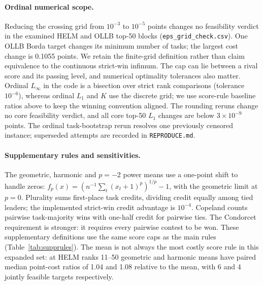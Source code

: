 \documentclass{article}
\begin{document}
\paragraph{Ordinal numerical scope.} Reducing the crossing grid from $10^{-3}$ to $10^{-5}$ points changes no feasibility verdict in the examined HELM and OLLB top-50 blocks (\texttt{eps\_grid\_check.csv}). One OLLB Borda target changes its minimum number of tasks; the largest cost change is 0.1055 points. We retain the finite-grid definition rather than claim equivalence to the continuous strict-win infimum. The cap can lie between a rival score and its passing level, and numerical optimality tolerances also matter. Ordinal $L_\infty$ in the code is a bisection over strict rank comparisons (tolerance $10^{-6}$), whereas ordinal $L_1$ and $K$ use the discrete grid; we use score-rule baseline ratios above to keep the winning convention aligned. The rounding reruns change no core feasibility verdict, and all core top-50 $L_1$ changes are below $3\times10^{-9}$ points. The ordinal task-bootstrap rerun resolves one previously censored instance; superseded attempts are recorded in \texttt{REPRODUCE.md}.

\paragraph{Supplementary rules and sensitivities.} The geometric, harmonic and $p=-2$ power means use a one-point shift to handle zeros: $f_p(x)=(n^{-1}\sum_t(x_t+1)^p)^{1/p}-1$, with the geometric limit at $p=0$. Plurality sums first-place task credits, dividing credit equally among tied leaders; the implemented strict-win credit advantage is $10^{-4}$. Copeland counts pairwise task-majority wins with one-half credit for pairwise ties. The Condorcet requirement is stronger: it requires every pairwise contest to be won. These supplementary definitions use the same score caps as the main rules (Table~\ref{tab:supprules}). The mean is not always the most costly score rule in this expanded set: at HELM ranks 11--50 geometric and harmonic means have paired median point-cost ratios of 1.04 and 1.08 relative to the mean, with 6 and 4 jointly feasible targets respectively.
\end{document}
